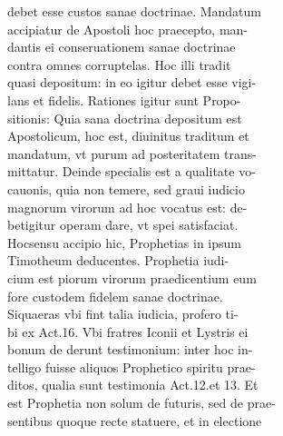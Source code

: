 \documentclass{article}
\begin{document}
\begin{pages}
                debet esse custos sanae doctrinae. Mandatum \\
                accipiatur de Apostoli hoc praecepto, man- \\
                dantis ei conseruationem sanae doctrinae \\
                contra omnes corruptelas. Hoc illi tradit \\
                quasi depositum: in eo igitur debet esse vigi- \\
                lans et fidelis. Rationes igitur sunt Propo- \\
                sitionis: Quia sana doctrina depositum est \\
                Apostolicum, hoc est, diuinitus traditum et \\
                mandatum, vt purum ad posteritatem trans- \\
                mittatur. Deinde specialis est a qualitate vo- \\
                cauonis, quia non temere, sed graui iudicio \\
                magnorum virorum ad hoc vocatus est: de- \\
                betigitur operam dare, vt spei satisfaciat. \\
                Hocsensu accipio hic, Prophetias in ipsum \\
                Timotheum deducentes. Prophetia iudi- \\
                cium est piorum virorum praedicentium eum \\
                fore custodem fidelem sanae doctrinae. \\
                Siquaeras vbi fint talia iudicia, profero ti- \\
                bi ex Act.16. Vbi fratres Iconii et Lystris ei \\
                bonum de derunt testimonium: inter hoc in- \\
                telligo fuisse aliquos Prophetico spiritu prae- \\
                ditos, qualia sunt testimonia Act.12.et 13. Et \\
                est Prophetia non solum de futuris, sed de prae- \\
                sentibus quoque recte statuere, et in electione \\

\end{pages}
\end{document}
